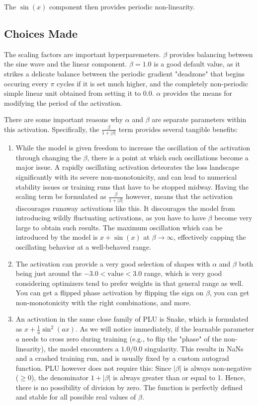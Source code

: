 \documentclass[11pt, letterpaper]{article}
\begin{document}
The $\sin(x)$ component then provides periodic non-linearity.

\subsection{Choices Made}

The scaling factors are important hyperparemeters. $\beta$ provides balancing between the sine wave and the linear component. $\beta=1.0$ is a good default value, as it strikes a delicate balance between the periodic gradient "deadzone" that begins occuring every $\pi$ cycles if it is set much higher, and the completely non-periodic simple linear unit obtained from setting it to $0.0$. $\alpha$ provides the means for modifying the period of the activation.

There are some important reasons why $\alpha$ and $\beta$ are separate parameters within this activation. Specifically, the $\frac{\beta}{1 + \lvert\beta\rvert}$ term provides several tangible benefits:
\begin{enumerate}
    \item While the model is given freedom to increase the oscillation of the activation through changing the $\beta$, there is a point at which such oscillations become a major issue. A rapidly oscillating activation deteorates the loss landscape significantly with its severe non-monotonicity, and can lead to numerical stability issues or training runs that have to be stopped midway. Having the scaling term be formulated as $\frac{\beta}{1 + \lvert\beta\rvert}$ however, means that the activation discourages runaway activations like this. It discourages the model from introducing wildly fluctuating activations, as you have to have $\beta$ become very large to obtain such results. The maximum oscillation which can be introduced by the model is $x + \sin(x)$ at $\beta \to \infty$, effectively capping the oscillating behavior at a well-behaved range.
    \item The activation can provide a very good selection of shapes with $\alpha$ and $\beta$ both being just around the $-3.0 < \text{value} < 3.0$ range, which is very good considering optimizers tend to prefer weights in that general range as well. You can get a flipped phase activation by flipping the sign on $\beta$, you can get non-monotonicity with the right combinations, and more.
    \item An activation in the same close family of PLU is Snake, which is formulated as $x + \frac{1}{a} \sin^2(ax)$. As we will notice immediately, if the learnable parameter $a$ needs to cross zero during training (e.g., to flip the "phase" of the non-linearity), the model encounters a $1.0/0.0$ singularity. This results in NaNs and a crashed training run, and is usually fixed by a custom autograd function. PLU however does not require this: Since $\lvert\beta\rvert$ is always non-negative ($\ge 0$), the denominator $1 + \lvert\beta\rvert$ is always greater than or equal to 1. Hence, there is no possibility of division by zero. The function is perfectly defined and stable for all possible real values of $\beta$.
\end{enumerate}
\end{document}
